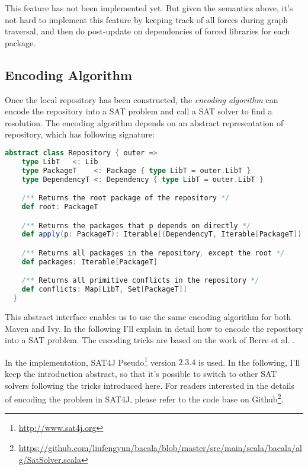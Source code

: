 This feature has not been implemented yet. But given the semantics above, it's not hard to implement this feature by keeping track of all forces during graph traversal, and then do post-update on dependencies of forced libraries for each package.



\subsection{Encoding Algorithm}

Once the local repository has been constructed, the \emph{encoding algorithm} can encode the repository into a SAT problem and call a SAT solver to find a resolution. The encoding algorithm depends on an abstract representation of repository, which has following signature:

\begin{lstlisting}[language=Scala]
  abstract class Repository { outer =>
    type LibT   <: Lib
    type PackageT    <: Package { type LibT = outer.LibT }
    type DependencyT <: Dependency { type LibT = outer.LibT }

    /** Returns the root package of the repository */
    def root: PackageT

    /** Returns the packages that p depends on directly */
    def apply(p: PackageT): Iterable[(DependencyT, Iterable[PackageT])]

    /** Returns all packages in the repository, except the root */
    def packages: Iterable[PackageT]

    /** Returns all primitive conflicts in the repository */
    def conflicts: Map[LibT, Set[PackageT]]
  }
\end{lstlisting}

This abstract interface enables us to use the same encoding algorithm for both Maven and Ivy. In the following I'll explain in detail how to encode the repository into a SAT problem. The encoding tricks are based on the work of Berre et al. \cite{berre2009dependency}.

In the implementation, SAT4J Pseudo\footnote{\url{http://www.sat4j.org}} version $2.3.4$ is used. In the following, I'll keep the introduction abstract, so that it's possible to switch to other SAT solvers following the tricks introduced here. For readers interested in the details of encoding the problem in SAT4J, please refer to the code base on Github\footnote{\url{https://github.com/liufengyun/bacala/blob/master/src/main/scala/bacala/alg/SatSolver.scala}}.

